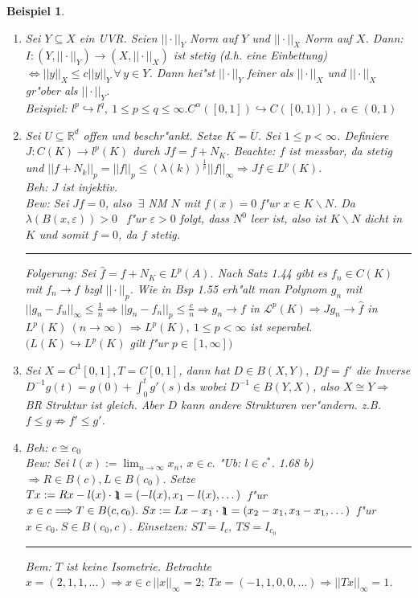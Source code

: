\documentclass[a4paper,11pt]{book}
\newcommand{\R}{{\mathbb R}}
\newcommand{\sL}{{\mathcal L}}
\newcommand{\sn}[1]{||#1||_{\infty}}
\newcommand{\eps}{{\varepsilon}}
\newcommand{\eb}{\begin{flushright} \rule{1ex}{1ex} \end{flushright}}
\newcommand{\id}{1\hspace{-0,9ex}\raisebox{-0,2ex}{1}}
\def\d{\mbox{d}}
\newtheorem{Bsp}[Def]{Beispiel}
\theoremstyle{nonumberplain}
\begin{document}
\begin{Bsp}
\begin{enumerate}
\item[a)] Sei $Y \subseteq X$ ein UVR. Seien $||\cdot||_Y$ Norm auf $Y$ und $||\cdot||_X$ Norm auf $X$. Dann: $I: (Y,||\cdot||_Y) \rightarrow (X,||\cdot||_X)$ ist stetig (d.h. eine Einbettung) $\Longleftrightarrow ||y||_X \leq c ||y||_Y \ \forall\, y \in Y$. Dann hei"st $||\cdot||_Y$ feiner als $||\cdot||_X$ und $||\cdot||_X$ gr"ober als $||\cdot||_Y$.\\
Beispiel: $l^p \hookrightarrow l^q,\ 1 \leq p \leq q \leq \infty. C^{\alpha}([0,1]) \hookrightarrow C([0,1)]),\ \alpha \in (0,1)$

\item[b)] Sei $U \subseteq \R^d$ offen und beschr"ankt. Setze $K = \overline{U}$. Sei $1 \leq p < \infty$. Definiere $J: C(K) \rightarrow l^p(K)$ durch $Jf = f+N_K$. Beachte: $f$ ist messbar, da stetig und $||f + N_k||_p = ||f||_p \leq (\lambda(k))^{\frac1{p}} \sn{f} \Rightarrow Jf \in L^p(K)$.\\
\emph{Beh:} $J$ ist injektiv.\\
\emph{Bew:} Sei $Jf = 0$, also $\ \exists$ NM $N$ mit $f(x) = 0$ f"ur $x \in K \backslash N$. Da $\lambda(B(x,\eps)) > 0$ \ f"ur $\eps > 0$ folgt, dass $N^0$ leer ist, also ist $K \backslash N$ dicht in $K$ und somit $f = 0$, da $f$ stetig. \eb
Folgerung: Sei $\hat{f} = f + N_K \in L^p(A)$. Nach Satz 1.44 gibt es $f_n \in C(K)$ mit $f_n \rightarrow f$ bzgl $||\cdot||_p$. Wie in Bsp 1.55 erh"alt man Polynom $g_n$ mit $\sn{g_n - f_n} \leq \frac1{n} \Rightarrow ||g_n-f_n||_p \leq \frac{c}{n} \Rightarrow g_n \rightarrow f$ in $\sL^p(K) \Rightarrow Jg_n \rightarrow \hat{f}$ in $L^p(K)\ (n \rightarrow \infty) \ \Rightarrow L^p(K),\ 1 \leq p < \infty$ ist seperabel. $(L(K) \hookrightarrow L^p(K)$ gilt f"ur $p \in [1,\infty])$

\item[c)] Sei $X=C^1[0,1], T=C[0,1]$, dann hat $D \in B(X,Y),\ Df = f'$ die Inverse $D^{-1}g(t) = g(0) + \int_0^t g'(s)\d s$ wobei $D^{-1} \in B(Y,X)$, also $X \cong Y \Rightarrow$ BR Struktur ist gleich. Aber $D$ kann andere Strukturen ver"andern. z.B. $f \leq g \not\Rightarrow f' \leq g'$.

\item[d)] \emph{Beh:} $c \cong c_0$\\
\emph{Bew:} Sei $l(x) := \lim_{n \rightarrow \infty} x_n,\ x \in c.$ "Ub: $l \in c^{\ast}$. 1.68 b) $\Rightarrow R \in B(c), L \in B(c_0)$. Setze $Tx := Rx - l(x) \cdot \id = (-l(x), x_1-l(x), \dots )$\ f"ur $x \in c \Longrightarrow  T \in B(c,c_0). \ Sx := Lx - x_1 \cdot \id = (x_2-x_1, x_3-x_1, \dots )$\ f"ur $x \in c_0.\ S \in B(c_0,c)$. Einsetzen: $ST = I_c,\ TS = I_{c_0}$ \eb
\emph{Bem:} $T$ ist keine Isometrie. Betrachte $x = (2,1,1,\dots) \Rightarrow x \in c \ \sn{x}=2;\ Tx = (-1,1,0,0,\dots) \Rightarrow \sn{Tx}=1$.


\end{enumerate}
\end{Bsp}
\end{document}
